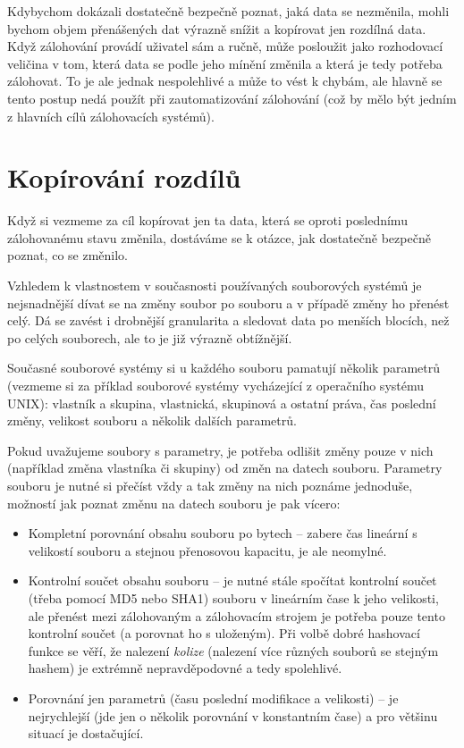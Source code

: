Kdybychom dokázali dostatečně bezpečně poznat, jaká data se nezměnila, mohli
bychom objem přenášených dat výrazně snížit a kopírovat jen rozdílná data.
Když zálohování provádí uživatel sám a ručně, může posloužit jako rozhodovací
veličina v tom, která data se podle jeho mínění změnila a která je tedy potřeba
zálohovat. To je ale jednak nespolehlivé a může to vést k chybám, ale hlavně se
tento postup nedá použít při zautomatizování zálohování (což by mělo být jedním
z hlavních cílů zálohovacích systémů).

\newpage

\section{Kopírování rozdílů}

Když si vezmeme za cíl kopírovat jen ta data, která se oproti poslednímu
zálohovanému stavu změnila, dostáváme se k otázce, jak dostatečně bezpečně
poznat, co se změnilo.

Vzhledem k vlastnostem v současnosti používaných souborových systémů je
nejsnadnější dívat se na změny soubor po souboru a v případě změny ho přenést
celý. Dá se zavést i drobnější granularita a sledovat data po menších blocích,
než po celých souborech, ale to je již výrazně obtížnější.


Současné souborové systémy si u každého souboru pamatují několik parametrů
(vezmeme si za příklad souborové systémy vycházející z operačního systému
\gls{UNIX}): vlastník a skupina, vlastnická, skupinová a ostatní práva, čas
poslední změny, velikost souboru a několik dalších parametrů.

Pokud uvažujeme soubory s parametry, je potřeba odlišit změny pouze v nich
(například změna vlastníka či skupiny) od změn na datech souboru. Parametry
souboru je nutné si přečíst vždy a tak změny na nich poznáme jednoduše, možností
jak poznat změnu na datech souboru je pak vícero:


\begin{itemize}
	\item Kompletní porovnání obsahu souboru po bytech -- zabere čas lineární
	s velikostí souboru a stejnou přenosovou kapacitu, je ale neomylné.
	\item Kontrolní součet obsahu souboru -- je nutné stále spočítat kontrolní
	součet (třeba pomocí \gls{MD5} nebo \gls{SHA1}) souboru v lineárním čase
	k jeho velikosti, ale přenést mezi zálohovaným a zálohovacím strojem je
	potřeba pouze tento kontrolní součet (a porovnat ho s uloženým). Při volbě
	dobré hashovací funkce se věří, že nalezení {\it kolize} (nalezení více
	různých souborů se stejným hashem) je extrémně nepravděpodovné a tedy
	spolehlivé.
	\item Porovnání jen parametrů (času poslední modifikace a velikosti) --
	je nejrychlejší (jde jen o několik porovnání v konstantním čase) a pro
	většinu situací je dostačující.
\end{itemize}

